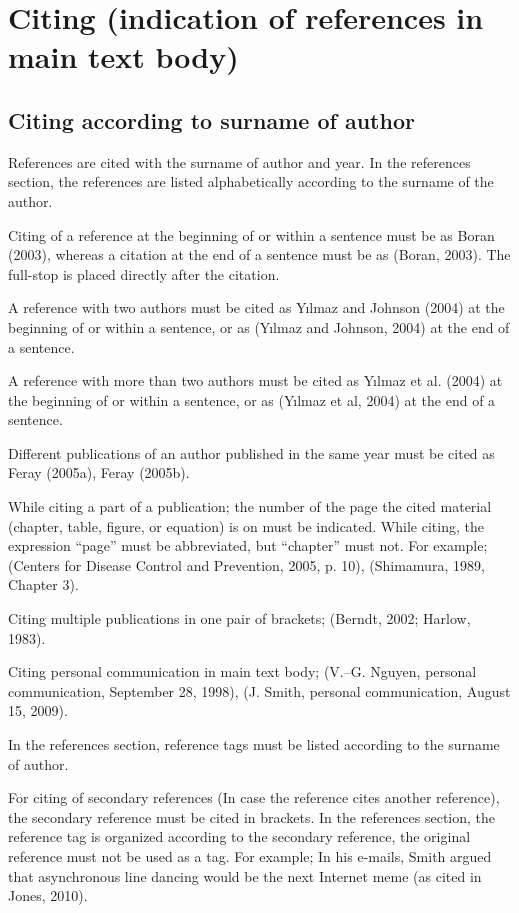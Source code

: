 \section{Citing (indication of references in main text body)}

\subsection{Citing according to surname of author}

References are cited with the surname of author and year. In the references section, the references are listed alphabetically according to the surname of the author.

Citing of a reference at the beginning of or within a sentence must be as Boran (2003), whereas a citation at the end of a sentence must be as (Boran, 2003). The full-stop is placed directly after the citation.
 
A reference with two authors must be cited as Yılmaz and Johnson (2004) at the beginning of or within a sentence, or as (Yılmaz and Johnson, 2004) at the end of a sentence. 

A reference with more than two authors must be cited as Yılmaz et al. (2004) at the beginning of or within a sentence, or as (Yılmaz et al, 2004) at the end of a sentence. 

Different publications of an author published in the same year must be cited as Feray (2005a), Feray (2005b). 

While citing a part of a publication; the number of the page the cited material (chapter, table, figure, or equation) is on must be indicated. While citing, the expression “page” must be abbreviated, but “chapter” must not. For example; (Centers for Disease Control and Prevention, 2005, p. 10), (Shimamura, 1989, Chapter 3). 

Citing multiple publications in one pair of brackets; (Berndt, 2002; Harlow, 1983). 

Citing personal communication in main text body; (V.–G. Nguyen, personal communication, September 28, 1998), (J. Smith, personal communication, August 15, 2009).

In the references section, reference tags must be listed according to the surname of author. 

For citing of secondary references (In case the reference cites another reference), the secondary reference must be cited in brackets.  In the references section, the reference tag is organized according to the secondary reference, the original reference must not be used as a tag. For example; In his e-mails, Smith argued that asynchronous line dancing would be the next Internet meme (as cited in Jones, 2010).

